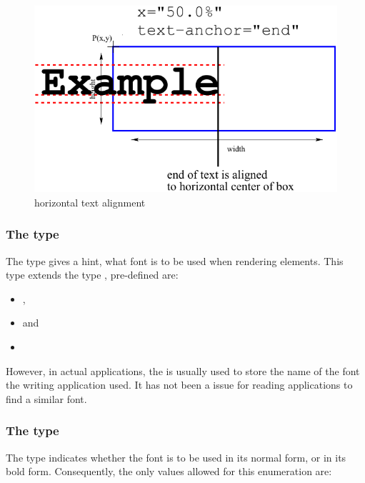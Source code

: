 \begin{figure}[!ht]
\begin{center}
\includegraphics[scale=0.60]{figures/HorizontalTextPlacement_End}
\end{center}
\caption{horizontal text alignment }
\label{HorizontalTextPlacement_End}
\end{figure}


\subsubsection{The  type}
\label{fontfamily-type}
The type  gives a hint, what font is to be used when
rendering \Text elements. This type extends the type , 
pre-defined are: 

\begin{itemize}
 \item {},
 \item {} and
 \item {}
\end{itemize}

However, in actual applications, the 
is usually used to store the name of the font the writing application used. It has not been a issue for reading applications to find a similar font. 

\subsubsection{The  type}
\label{fontweight-type}
The type  indicates whether the font is to be used in its normal form, or in its bold form. Consequently, the only values allowed for this enumeration are: 

